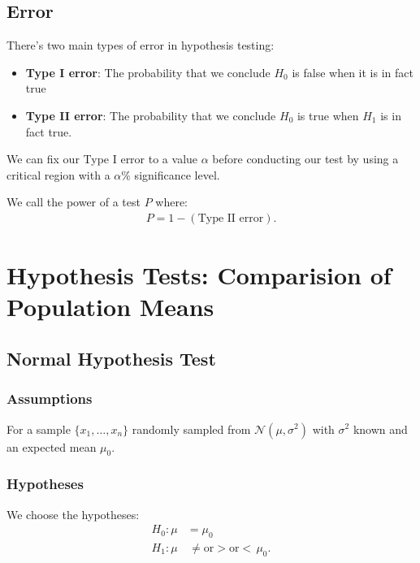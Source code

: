\documentclass[a4paper, 12pt, twoside]{article}
\begin{document}
\subsection{Error}

There's two main types of error in hypothesis testing:
\begin{itemize}
    \item \textbf{Type I error}: The probability that we
          conclude $H_0$ is false when it is in fact true
    \item \textbf{Type II error}: The probability that we
          conclude $H_0$ is true when $H_1$ is in fact true.
\end{itemize}
We can fix our Type I error to a value $\alpha$ before conducting
our test by using a critical region with a $\alpha\%$
significance level.

\vspace{\baselineskip}

We call the power of a test $P$ where:
\begin{align*}
    P = 1 - (\text{Type II error}).
\end{align*}

\newpage

\section{Hypothesis Tests: Comparision of Population Means}

\subsection{Normal Hypothesis Test}

\subsubsection{Assumptions}

For a sample $\{x_1, \ldots, x_n\}$ randomly sampled from
$\mathcal{N}(\mu, \sigma^2)$ with $\sigma^2$ known and an
expected mean $\mu_0$.

\subsubsection{Hypotheses}

We choose the hypotheses:
\begin{align*}
    H_0 : \mu & = \mu_0                                   \\
    H_1 : \mu & \, \neq \text{or} > \text{or} < \, \mu_0.
\end{align*}
\end{document}
